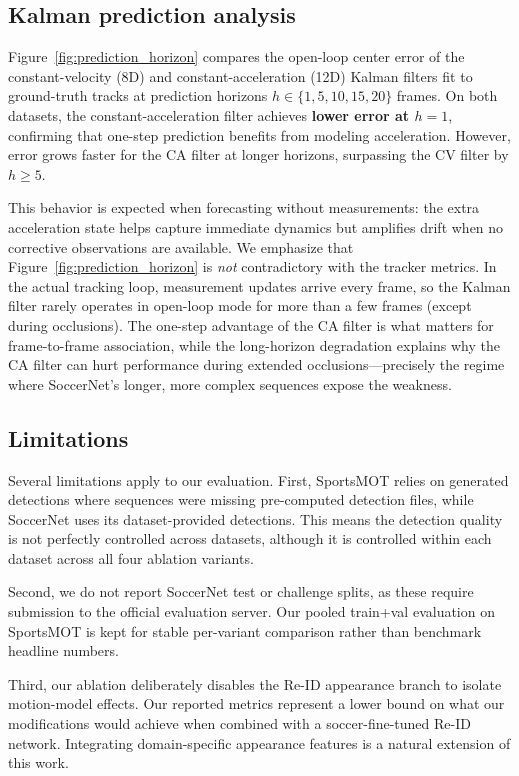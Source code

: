 \subsection{Kalman prediction analysis}

Figure~\ref{fig:prediction_horizon} compares the open-loop center error of
the constant-velocity (8D) and constant-acceleration (12D) Kalman filters
fit to ground-truth tracks at prediction horizons
$h \in \{1, 5, 10, 15, 20\}$ frames. On both datasets, the
constant-acceleration filter achieves \textbf{lower error at $h = 1$},
confirming that one-step prediction benefits from modeling acceleration.
However, error grows faster for the CA filter at longer horizons, surpassing
the CV filter by $h \geq 5$.

This behavior is expected when forecasting without measurements: the extra
acceleration state helps capture immediate dynamics but amplifies drift when
no corrective observations are available. We emphasize that
Figure~\ref{fig:prediction_horizon} is \emph{not} contradictory with the
tracker metrics. In the actual tracking loop, measurement updates arrive
every frame, so the Kalman filter rarely operates in open-loop mode for more
than a few frames (except during occlusions). The one-step advantage of the
CA filter is what matters for frame-to-frame association, while the
long-horizon degradation explains why the CA filter can hurt performance
during extended occlusions---precisely the regime where SoccerNet's longer,
more complex sequences expose the weakness.

\subsection{Limitations}

Several limitations apply to our evaluation. First, SportsMOT relies on
generated detections where sequences were missing pre-computed detection
files, while SoccerNet uses its dataset-provided detections. This means the
detection quality is not perfectly controlled across datasets, although it
is controlled within each dataset across all four ablation variants.

Second, we do not report SoccerNet test or challenge splits, as these
require submission to the official evaluation server. Our pooled train+val
evaluation on SportsMOT is kept for stable per-variant comparison rather
than benchmark headline numbers.

Third, our ablation deliberately disables the Re-ID appearance branch to
isolate motion-model effects. Our reported metrics represent a lower bound
on what our modifications would achieve when combined with a
soccer-fine-tuned Re-ID network. Integrating domain-specific appearance
features is a natural extension of this work.

